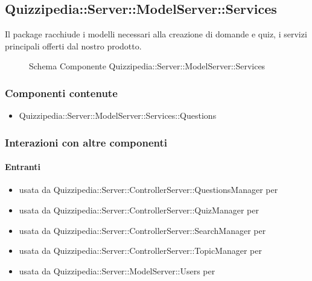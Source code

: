 \subsection{Quizzipedia::Server::ModelServer::Services}
Il package racchiude i modelli necessari alla creazione di domande e quiz, i servizi principali offerti dal nostro prodotto.
\begin{figure}[H]
\centering
\noindent{}
\caption[Schema Componente Quizzipedia::Server::ModelServer::Services]{Schema Componente Quizzipedia::Server::ModelServer::Services}
\end{figure}
\subsubsection{Componenti contenute}
\begin{itemize}
\item Quizzipedia::Server::ModelServer::Services::Questions
\end{itemize}
\subsubsection{Interazioni con altre componenti}
\paragraph{Entranti}
\begin{itemize}
\item usata da Quizzipedia::Server::ControllerServer::QuestionsManager per 
\item usata da Quizzipedia::Server::ControllerServer::QuizManager per 
\item usata da Quizzipedia::Server::ControllerServer::SearchManager per 
\item usata da Quizzipedia::Server::ControllerServer::TopicManager per 
\item usata da Quizzipedia::Server::ModelServer::Users per 
\end{itemize}
